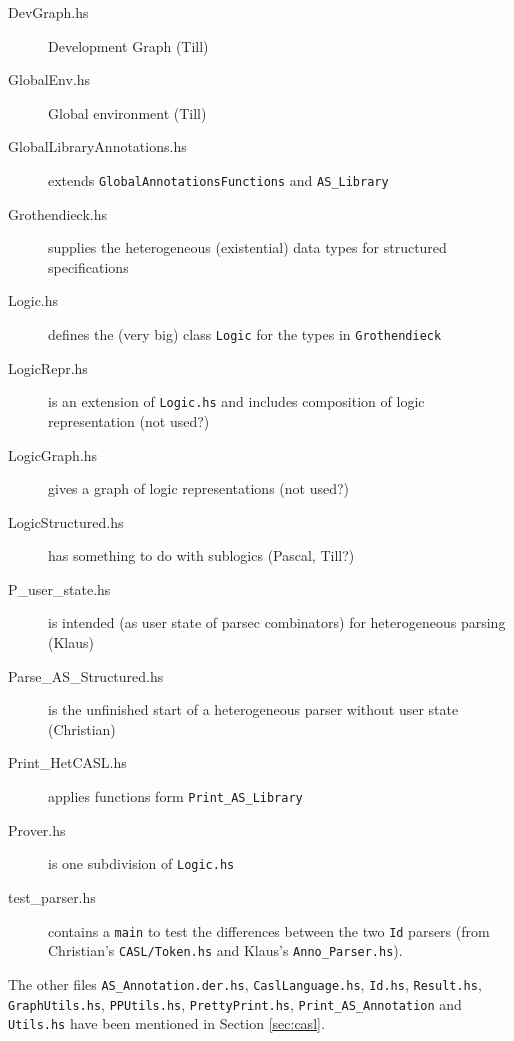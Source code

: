 \documentclass{article}
\begin{document}
\begin{description}
\item[DevGraph.hs] Development Graph (Till)
\item[GlobalEnv.hs] Global environment (Till)
\item[GlobalLibraryAnnotations.hs] extends \texttt{GlobalAnnotationsFunctions} and \texttt{AS\_Library}
\item[Grothendieck.hs] supplies the heterogeneous (existential) data
  types for structured specifications
\item[Logic.hs] defines the (very big) class \texttt{Logic} for the
  types in \texttt{Grothendieck}
\item[LogicRepr.hs] is an extension of \texttt{Logic.hs} and includes
  composition of logic representation (not used?)
\item[LogicGraph.hs] gives a graph of logic representations (not used?)
\item[LogicStructured.hs] has something to do with sublogics (Pascal, Till?)
\item[P\_user\_state.hs] is intended (as user state of parsec
  combinators) for heterogeneous parsing (Klaus)
\item[Parse\_AS\_Structured.hs] is the unfinished start of a heterogeneous
  parser without user state (Christian)
\item[Print\_HetCASL.hs] applies functions form \texttt{Print\_AS\_Library}
\item[Prover.hs] is one subdivision of \texttt{Logic.hs}
\item[test\_parser.hs] contains a \texttt{main} to test the differences
  between the two \texttt{Id} parsers (from Christian's
  \texttt{CASL/Token.hs} and Klaus's \texttt{Anno\_Parser.hs}).
\end{description}

The other files \texttt{AS\_Annotation.der.hs},
\texttt{CaslLanguage.hs}, \texttt{Id.hs}, \texttt{Result.hs},
\texttt{GraphUtils.hs}, \texttt{PPUtils.hs}, \texttt{PrettyPrint.hs},
\texttt{Print\_AS\_Annotation} and \texttt{Utils.hs} have been mentioned in 
Section \ref{sec:casl}.
\end{document}
